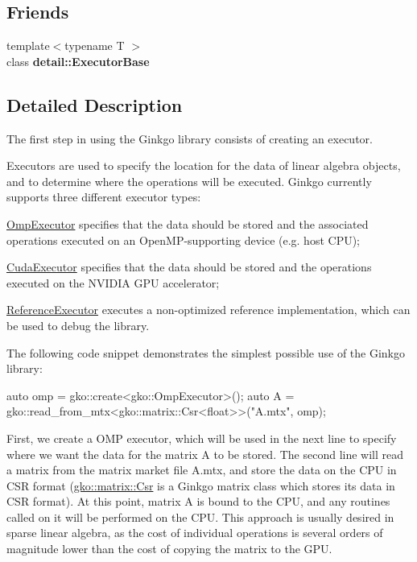 \subsection*{Friends}
\begin{DoxyCompactItemize}
\item 
\mbox{\label{classgko_1_1Executor_aaeab680299cad69bf82df40b91b7dcd4}} 
{\footnotesize template$<$typename T $>$ }\\class {\bfseries detail\+::\+Executor\+Base}
\end{DoxyCompactItemize}


\subsection{Detailed Description}
The first step in using the Ginkgo library consists of creating an executor. 

Executors are used to specify the location for the data of linear algebra objects, and to determine where the operations will be executed. Ginkgo currently supports three different executor types\+:


\begin{DoxyItemize}
\item \hyperlink{classgko_1_1OmpExecutor}{Omp\+Executor} specifies that the data should be stored and the associated operations executed on an Open\+M\+P-\/supporting device (e.\+g. host C\+PU);
\item \hyperlink{classgko_1_1CudaExecutor}{Cuda\+Executor} specifies that the data should be stored and the operations executed on the N\+V\+I\+D\+IA G\+PU accelerator;
\item \hyperlink{classgko_1_1ReferenceExecutor}{Reference\+Executor} executes a non-\/optimized reference implementation, which can be used to debug the library.
\end{DoxyItemize}

The following code snippet demonstrates the simplest possible use of the Ginkgo library\+:


\begin{DoxyCode}
\textcolor{keyword}{auto} omp = gko::create<gko::OmpExecutor>();
\textcolor{keyword}{auto} A = gko::read\_from\_mtx<gko::matrix::Csr<float>>(\textcolor{stringliteral}{"A.mtx"}, omp);
\end{DoxyCode}


First, we create a O\+MP executor, which will be used in the next line to specify where we want the data for the matrix A to be stored. The second line will read a matrix from the matrix market file \textquotesingle{}A.\+mtx\textquotesingle{}, and store the data on the C\+PU in C\+SR format (\hyperlink{classgko_1_1matrix_1_1Csr}{gko\+::matrix\+::\+Csr} is a Ginkgo matrix class which stores its data in C\+SR format). At this point, matrix A is bound to the C\+PU, and any routines called on it will be performed on the C\+PU. This approach is usually desired in sparse linear algebra, as the cost of individual operations is several orders of magnitude lower than the cost of copying the matrix to the G\+PU.

